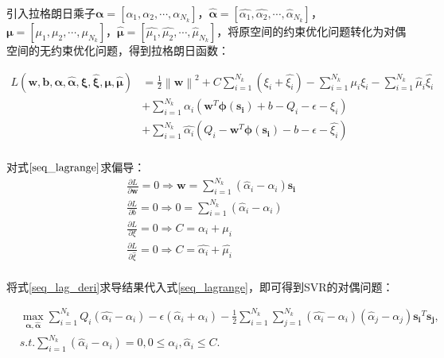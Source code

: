 引入拉格朗日乘子$\bm{\alpha}=[\alpha_{1},\alpha_{2},\cdots,\alpha_{N_{k}}]$，$\bm{\hat{\alpha}}=[\hat{\alpha_{1}},\hat{\alpha_{2}},\cdots,\hat{\alpha}_{N_{k}}]$，$\bm{\mu}=[\mu_{1},\mu_{2},\cdots,\mu_{N_{k}}]$，$\bm{\hat{\mu}}=[\hat{\mu_{1}},\hat{\mu_{2}},\cdots,\hat{\mu}_{N_{k}}]$，将原空间的约束优化问题转化为对偶空间的无约束优化问题，得到拉格朗日函数：

\begin{equation}\label{seq_lagrange}
\begin{aligned}
L(\mathbf{w}, \mathbf{b}, \bm{\alpha}, \bm{\hat{\alpha}}, \bm{\xi}, \bm{\hat{\xi}},
\bm{\mu},\bm{\hat{\mu}})&=\frac{1}{2} \left \| \mathbf{{w}} \right \|^{2} + C \sum_{i=1}^{N_{k}}(\xi_{i} + \hat{\xi_{i}}) - \sum_{i=1}^{N_{k}}\mu_{i}\xi_{i} - \sum_{i=1}^{N_{k}}\hat{\mu}_{i}\hat{\xi_{i}} \\ 
&+ \sum_{i=1}^{N_{k}} \alpha_{i}(\mathbf{w}^{T} \bm{\phi(s_{i})} + b - Q_{i} - \epsilon - \xi_{i}) \\
&+ \sum_{i=1}^{N_{k}} \hat{\alpha_{i}}(Q_{i} - \mathbf{w}^{T} \bm{\phi(s_{i})} - b - \epsilon - \hat{\xi_{i}})\\
\end{aligned}
\end{equation}

对式$\eqref{seq_lagrange}$求偏导：
\begin{equation}\label{seq_lag_deri}
\begin{split}
&\frac{\partial{L}}{\partial{\bm{w}}}=0 \Rightarrow \bm{w} = \sum_{i=1}^{N_{k}}(\hat{\alpha}_{i}-\alpha_{i})\bm{s_{i}}
\\ 
&\frac{\partial{L}}{\partial{b}}=0 \Rightarrow 0 = \sum_{i=1}^{N_{k}}(\hat{\alpha}_{i}-\alpha_{i})
\\ 
&\frac{\partial{L}}{\partial{\xi}}=0 \Rightarrow  C = \alpha_{i} + \mu_{i}
\\ 
&\frac{\partial{L}}{\partial{\hat{\xi}}}=0 \Rightarrow  C = \hat{\alpha_{i}} + \hat{\mu_{i}}
\\
\end{split}
\end{equation}

将式\eqref{seq_lag_deri}求导结果代入式\eqref{seq_lagrange}，即可得到SVR的对偶问题：

\begin{equation}\label{seq_lagr_dual}
\begin{split}
&\max_{\bm{\alpha}, \bm{\hat{\alpha}}} \sum_{i=1}^{N_{k}} Q_{i}(\hat{\alpha_{i}} - \alpha_{i}) - \epsilon (\hat{\alpha}_{i} + \alpha_{i}) - \frac{1}{2} \sum_{i=1}^{N_{k}} \sum_{j=1}^{N_{k}}(\hat{\alpha_{i}}-\alpha_{i})(\hat{\alpha}_{j}-\alpha_{j})\bm{s_{i}}^{T}\bm{s_{j}},\\
&s.t. \sum_{i=1}^{N_{k}}(\hat{\alpha}_{i}-\alpha_{i})=0, 0 \leqslant \alpha_{i},\hat{\alpha}_{i} \leqslant C.
\end{split}
\end{equation}


